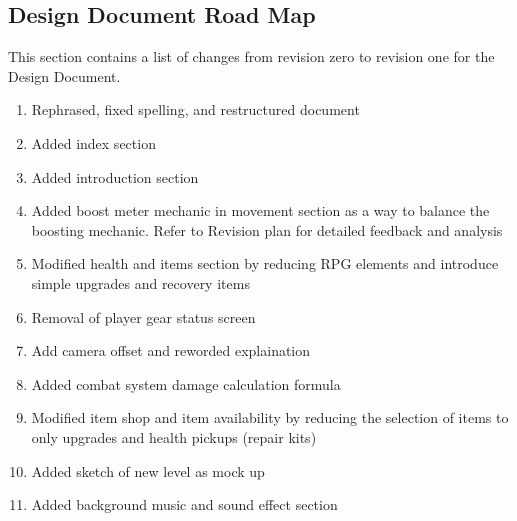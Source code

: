 \documentclass[]{article}
\begin{document}
\subsection*{Design Document Road Map}
This section contains a list of changes from revision zero to revision one for the Design Document.
 \begin{enumerate}
        \item Rephrased, fixed spelling, and restructured document
        \item Added index section
        \item Added introduction section
        \item Added boost meter mechanic in movement section as a way to balance the boosting mechanic. Refer to Revision plan for detailed feedback and analysis
        \item Modified health and items section by reducing RPG elements and introduce simple upgrades and recovery items
        \item Removal of player gear status screen
        \item Add camera offset and reworded explaination
        \item Added combat system damage calculation formula
        \item Modified item shop and item availability by reducing the selection of items to only upgrades and health pickups (repair kits)
        \item Added sketch of new level as mock up
        \item Added background music and sound effect section 
 \end{enumerate}
\end{document}
